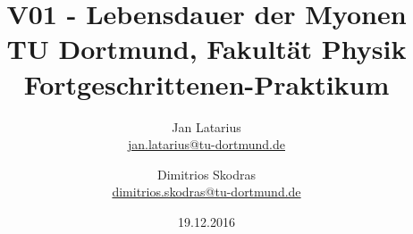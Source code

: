 



\title{V01 - Lebensdauer der Myonen\\				%
\large TU Dortmund, Fakultät Physik\\ 
\normalsize Fortgeschrittenen-Praktikum}

\author{Jan Latarius\\			%
{\small \href{jan.latarius@tu-dortmund.de}{jan.latarius@tu-dortmund.de}}	%
\and						%
Dimitrios Skodras\\					%
{\small \href{dimitrios.skodras@tu-dortmund.de}{dimitrios.skodras@tu-dortmund.de}}		%
}
\date{19.12.2016}				%





\maketitle					%
\thispagestyle{empty} 				%



\tableofcontents


\newpage					%


